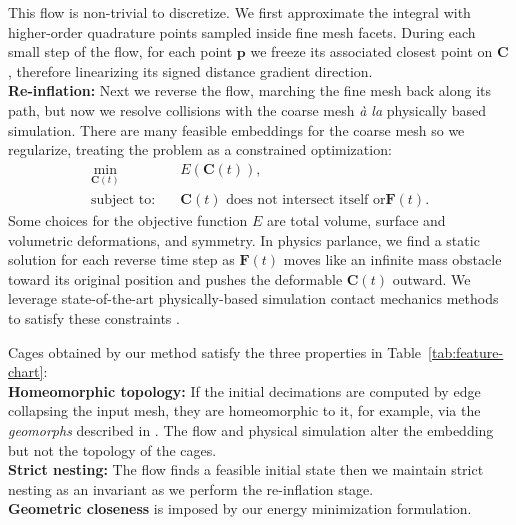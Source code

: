 \documentclass{cgyrf15}
\begin{document}
This flow is non-trivial to discretize. We first approximate the integral with
higher-order quadrature points sampled inside fine mesh facets. 
During each small step of the flow,
for each point $\textbf{p}$ we freeze its associated closest point
on $\mathbf{C}$, therefore linearizing its signed distance gradient direction. 
%
\\[0.5em]
\noindent \textbf{Re-inflation:} Next we reverse the flow,
marching the fine mesh back along its path, but now we resolve collisions with
the coarse mesh \emph{\`{a} la} physically based simulation. There are many
feasible embeddings for the coarse mesh so we regularize, treating the problem
as a constrained optimization:
\begin{align}
\min_{\mathbf{C}(t)}  &\quad E(\mathbf{C}(t)),\\
\text{subject to:} &\quad \text{$\mathbf{C}(t)$ does not intersect itself or
$\mathbf{F}(t)$}.\nonumber
\end{align}
Some choices for the objective function $E$ are total volume, surface and volumetric deformations,
and symmetry. In physics parlance, we find a static solution for each reverse time step as
$\mathbf{F}(t)$ moves like an infinite mass obstacle toward its original
position and pushes the deformable $\mathbf{C}(t)$ outward. We leverage state-of-the-art
physically-based simulation contact mechanics methods to satisfy these
constraints \cite{Brochu:2009}. 

%
Cages obtained by our method satisfy the three properties in
Table~\ref{tab:feature-chart}:\\[0.5em]
\noindent \textbf{Homeomorphic topology:} If the initial decimations are
computed by edge collapsing the input mesh, they are homeomorphic to it, for
example, via the \emph{geomorphs} described in \cite{Hoppe:1996:PM}. The
flow and physical simulation alter the embedding but not the topology of the
cages.\\[0.5em]
\noindent \textbf{Strict nesting:} The flow finds a feasible initial state then
we maintain strict nesting as an invariant as we perform the re-inflation
stage.\\[0.5em]
\noindent \textbf{Geometric closeness} is imposed by our energy minimization
formulation.
\end{document}
